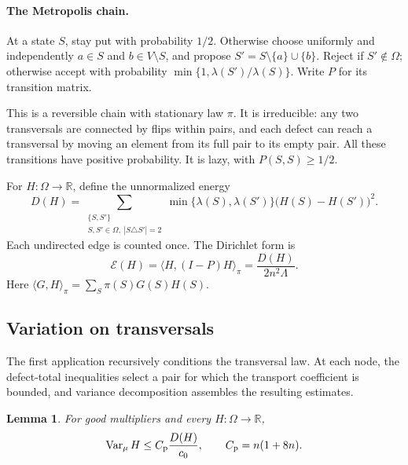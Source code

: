 \documentclass[11pt]{article}
\newtheorem{lemma}[theorem]{Lemma}
\theoremstyle{definition}
\newcommand{\R}{\mathbb R}
\newcommand{\Var}{\operatorname{Var}}
\newcommand{\calE}{\mathcal E}
\newcommand{\inner}[2]{\langle #1,#2\rangle}
\newcommand{\Om}{\Omega}
\begin{document}
\paragraph{The Metropolis chain.}
At a state $S$, stay put with probability $1/2$.  Otherwise choose
uniformly and independently $a\in S$ and $b\in V\setminus S$, and
propose $S'=S\setminus\{a\}\cup\{b\}$.  Reject if $S'\notin\Om$;
otherwise accept with probability $\min\{1,\lambda(S')/\lambda(S)\}$.
Write $P$ for its transition matrix.

This is a reversible chain with stationary law $\pi$.  It is irreducible:
any two transversals are connected by flips within pairs, and each defect
can reach a transversal by moving an element from its full pair to its
empty pair.  All these transitions have positive probability.  It is
lazy, with $P(S,S)\ge1/2$.

For $H:\Om\to\R$, define the unnormalized energy
\begin{equation}\label{eq:D}
 D(H)=\sum_{\substack{\{S,S'\}\\S,S'\in\Om,\ |S\triangle S'|=2}}
   \min\{\lambda(S),\lambda(S')\}\bigl(H(S)-H(S')\bigr)^2.
\end{equation}
Each undirected edge is counted once.  The Dirichlet form is
\begin{equation}\label{eq:Dirichlet}
 \calE(H)=\inner{H}{(I-P)H}_\pi=\frac{D(H)}{2n^2\Lambda}.
\end{equation}
Here $\inner{G}{H}_\pi=\sum_S\pi(S)G(S)H(S)$.

\subsection{Variation on transversals}

The first application recursively conditions the transversal law.
At each node, the defect-total inequalities select a pair for which
the transport coefficient is bounded, and variance decomposition
assembles the resulting estimates.

\begin{lemma}\label{lem:transversalvariance}
For good multipliers and every $H:\Om\to\R$,
\begin{equation}\label{eq:transversalvariance}
 \Var_\mu H\le C_{\rm p}\frac{D(H)}{c_0},
 \qquad C_{\rm p}=n(1+8n).
\end{equation}
\end{lemma}
\end{document}

